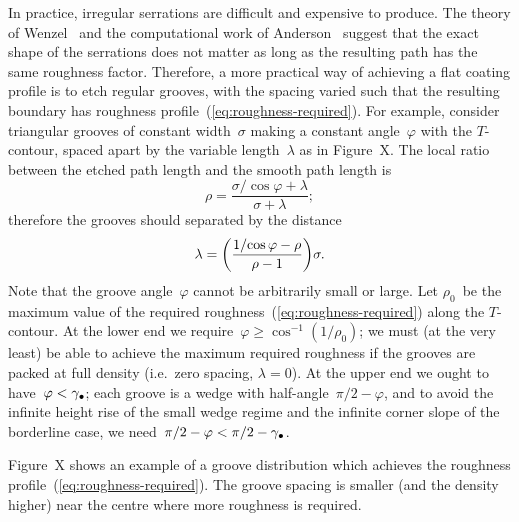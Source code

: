 In practice, irregular serrations are difficult and expensive to produce.
The theory of Wenzel~\cite{wenzel-1936-resistance-solid-surfaces-wetting}
and the computational work of Anderson~\cite[Section~6.4.5]%
  {anderson-2002-thesis-boundary-tracing-pdes}
suggest that the exact shape of the serrations does not matter
as long as the resulting path has the same roughness factor.
Therefore, a more practical way of achieving a flat coating profile
is to etch regular grooves,
with the spacing varied such that
the resulting boundary has roughness profile~(\ref{eq:roughness-required}).
For example, consider triangular grooves of constant width~$\sigma$
making a constant angle~$\varphi$ with the $T$-contour,
spaced apart by the variable length~$\lambda$
as in Figure~X. %
The local ratio
between the etched path length and the smooth path length
is
\begin{equation}
  \rho = \frac{\sigma / {\cos\varphi} + \lambda}{\sigma + \lambda};
  \label{eq:regular-groove-roughness}
\end{equation}
therefore the grooves should separated by the distance
\begin{equation}
  \lambda = \roundbr*{\frac{1 / {\cos\varphi} - \rho}{\rho - 1}} \sigma.
  \label{eq:regular-groove-spacing}
\end{equation}
Note that the groove angle~$\varphi$ cannot be arbitrarily small or large.
Let $\rho_0$~be the maximum value
of the required roughness~(\ref{eq:roughness-required})
along the $T$-contour.
At the lower end we require~$\varphi \ge \cos^{-1} (1 / \rho_0)$;
we must (at the very least) be able to achieve the maximum required roughness
if the grooves are packed at full density (i.e.~zero spacing, $\lambda = 0$).
At the upper end we ought to have~$\varphi < \gamma_\bullet$;
each groove is a wedge with half-angle~$\pi/2 - \varphi$,
and to avoid the infinite height rise of the small wedge regime
and the infinite corner slope of the borderline case,
we need~$\pi/2 - \varphi < \pi/2 - \gamma_\bullet$.

Figure~X %
shows an example of a groove distribution
which achieves the roughness profile~(\ref{eq:roughness-required}).
The groove spacing is smaller (and the density higher) near the centre
where more roughness is required.

